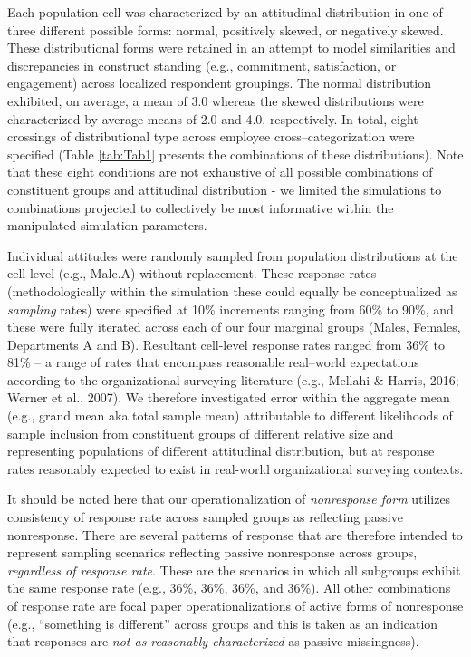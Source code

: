 \documentclass[
  man,mask]{apa7}
\begin{document}
Each population cell was characterized by an attitudinal distribution in one of three different possible forms: normal, positively skewed, or negatively skewed. These distributional forms were retained in an attempt to model similarities and discrepancies in construct standing (e.g., commitment, satisfaction, or engagement) across localized respondent groupings. The normal distribution exhibited, on average, a mean of 3.0 whereas the skewed distributions were characterized by average means of 2.0 and 4.0, respectively. In total, eight crossings of distributional type across employee cross--categorization were specified (Table \ref{tab:Tab1} presents the combinations of these distributions). Note that these eight conditions are not exhaustive of all possible combinations of constituent groups and attitudinal distribution - we limited the simulations to combinations projected to collectively be most informative within the manipulated simulation parameters.

Individual attitudes were randomly sampled from population distributions at the cell level (e.g., Male.A) without replacement. These response rates (methodologically within the simulation these could equally be conceptualized as \emph{sampling} rates) were specified at 10\% increments ranging from 60\% to 90\%, and these were fully iterated across each of our four marginal groups (Males, Females, Departments A and B). Resultant cell-level response rates ranged from 36\% to 81\% -- a range of rates that encompass reasonable real--world expectations according to the organizational surveying literature (e.g., Mellahi \& Harris, 2016; Werner et al., 2007). We therefore investigated error within the aggregate mean (e.g., grand mean aka total sample mean) attributable to different likelihoods of sample inclusion from constituent groups of different relative size and representing populations of different attitudinal distribution, but at response rates reasonably expected to exist in real-world organizational surveying contexts.

It should be noted here that our operationalization of \emph{nonresponse form} utilizes consistency of response rate across sampled groups as reflecting passive nonresponse. There are several patterns of response that are therefore intended to represent sampling scenarios reflecting passive nonresponse across groups, \emph{regardless of response rate}. These are the scenarios in which all subgroups exhibit the same response rate (e.g., 36\%, 36\%, 36\%, and 36\%). All other combinations of response rate are focal paper operationalizations of active forms of nonresponse (e.g., ``something is different'' across groups and this is taken as an indication that responses are \emph{not as reasonably characterized} as passive missingness).
\end{document}
